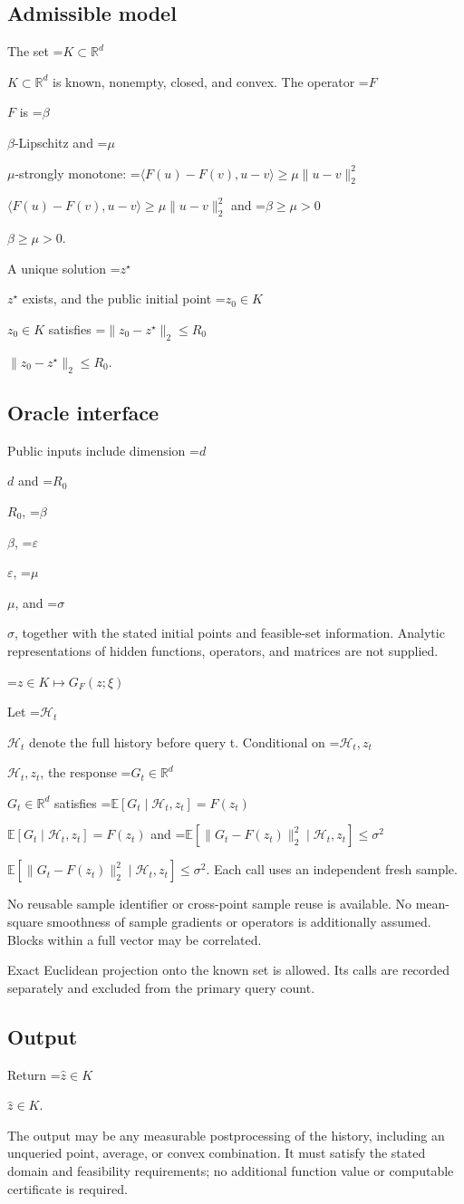 \documentclass[10pt,a4paper]{article}
\newcommand{\AtlasMath}[1]{\par\begingroup\centering\setbox0=\hbox{$\displaystyle #1$}\ifdim\wd0>1.4\linewidth\typeout{ATLAS WIDE FORMULA: \the\wd0}\fi\ifdim\wd0>\linewidth\resizebox{\linewidth}{!}{\box0}\else\box0\fi\par\endgroup}
\newcommand{\AtlasInlineMath}[1]{\begingroup\setbox0=\hbox{$#1$}\ifdim\wd0>.4\linewidth\endgroup\AtlasMath{#1}\else\endgroup$#1$\fi}
\begin{document}
\subsection{Admissible model}
The set \AtlasInlineMath{K\subset\mathbb{R}^d} is known, nonempty, closed, and convex. The operator \AtlasInlineMath{F} is \AtlasInlineMath{\beta}-Lipschitz and \AtlasInlineMath{\mu}-strongly monotone: \AtlasInlineMath{\langle F(u)-F(v),u-v\rangle\ge\mu\|u-v\|_2^2} and \AtlasInlineMath{\beta\ge\mu>0}.

A unique solution \AtlasInlineMath{z^\star} exists, and the public initial point \AtlasInlineMath{z_0\in K} satisfies \AtlasInlineMath{\|z_0-z^\star\|_2\le R_0}.

\subsection{Oracle interface}
Public inputs include dimension \AtlasInlineMath{d} and \AtlasInlineMath{R_0}, \AtlasInlineMath{\beta}, \AtlasInlineMath{\varepsilon}, \AtlasInlineMath{\mu}, and \AtlasInlineMath{\sigma}, together with the stated initial points and feasible-set information. Analytic representations of hidden functions, operators, and matrices are not supplied.


\AtlasMath{z\in K\longmapsto G_F(z;\xi)}


Let \AtlasInlineMath{\mathcal H_t} denote the full history before query t. Conditional on \AtlasInlineMath{\mathcal H_t,z_t}, the response \AtlasInlineMath{G_t\in\mathbb R^d} satisfies \AtlasInlineMath{\mathbb E[G_t\mid\mathcal H_t,z_t]=F(z_t)} and \AtlasInlineMath{\mathbb E[\|G_t-F(z_t)\|_2^2\mid\mathcal H_t,z_t]\le\sigma^2}. Each call uses an independent fresh sample.

No reusable sample identifier or cross-point sample reuse is available. No mean-square smoothness of sample gradients or operators is additionally assumed. Blocks within a full vector may be correlated.

Exact Euclidean projection onto the known set is allowed. Its calls are recorded separately and excluded from the primary query count.

\subsection{Output}
Return \AtlasInlineMath{\widehat{z}\in K}.

The output may be any measurable postprocessing of the history, including an unqueried point, average, or convex combination. It must satisfy the stated domain and feasibility requirements; no additional function value or computable certificate is required.
\end{document}

